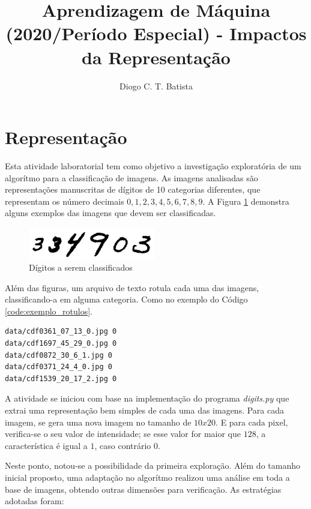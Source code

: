 \documentclass[12pt]{article}
\title{Aprendizagem de Máquina (2020/Período Especial) - Impactos da Representação}
\author{Diogo C. T. Batista\inst{1}}
\begin{document}
\maketitle

\section{Representação}

Esta atividade laboratorial tem como objetivo a investigação exploratória de um algorítmo para a classificação de imagens. As imagens analisadas são representações manuscritas de dígitos de 10 categorias diferentes, que representam os número decimais $0,1,2,3,4,5,6,7,8,9$. A Figura \ref{fig:image_1_digits} demonstra alguns exemplos das imagens que devem ser classificadas.

\begin{figure}[!htb]
  \centering
  \includegraphics[width=15em]{images/image_1_digits.jpg}
  \caption{Dígitos a serem classificados}
  \label{fig:image_1_digits}
\end{figure}

Além das figuras, um arquivo de texto rotula cada uma das imagens, classificando-a em alguma categoria. Como no exemplo do Código \ref{code:exemplo_rotulos}.

\begin{lstlisting}[caption={Exemplo dos Rótulos},captionpos=b,frame=single,label={code:exemplo_rotulos}]
data/cdf0361_07_13_0.jpg 0
data/cdf1697_45_29_0.jpg 0
data/cdf0872_30_6_1.jpg 0
data/cdf0371_24_4_0.jpg 0
data/cdf1539_20_17_2.jpg 0
\end{lstlisting}

A atividade se iniciou com base na implementação do programa \textit{digits.py} que extrai uma representação bem simples de cada uma das imagens. Para cada imagem, se gera uma nova imagem no tamanho de $10 x 20$. E para cada pixel, verifica-se o seu valor de intensidade; se esse valor for maior que $128$, a característica é igual a $1$, caso contrário $0$.

Neste ponto, notou-se a possibilidade da primeira exploração. Além do tamanho inicial proposto, uma adaptação no algorítmo realizou uma análise em toda a base de imagens, obtendo outras dimensões para verificação. As estratégias adotadas foram:
\end{document}
